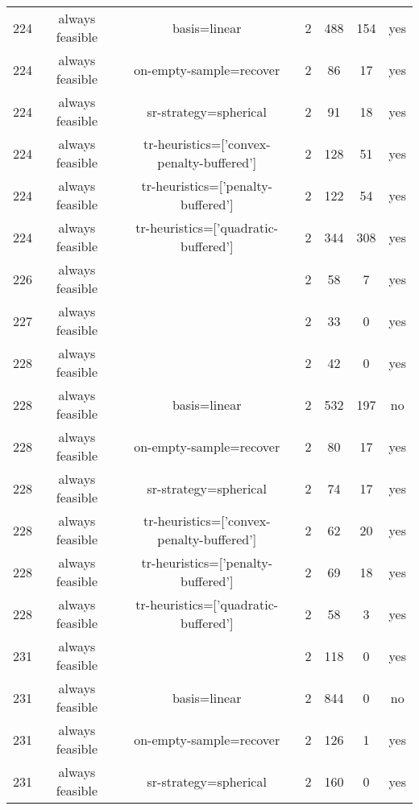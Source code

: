 \begin{scriptsize}
\begin{center}
\begin{longtable}{ccccccc}
224 & always feasible &                              basis=linear & 2 &    488 &    154 &     yes\\
224 & always feasible &                   on-empty-sample=recover & 2 &     86 &     17 &     yes\\
224 & always feasible &                     sr-strategy=spherical & 2 &     91 &     18 &     yes\\
224 & always feasible & tr-heuristics=['convex-penalty-buffered'] & 2 &    128 &     51 &     yes\\
224 & always feasible &        tr-heuristics=['penalty-buffered'] & 2 &    122 &     54 &     yes\\
224 & always feasible &      tr-heuristics=['quadratic-buffered'] & 2 &    344 &    308 &     yes\\
226 & always feasible &                                           & 2 &     58 &      7 &     yes\\
227 & always feasible &                                           & 2 &     33 &      0 &     yes\\
228 & always feasible &                                           & 2 &     42 &      0 &     yes\\
228 & always feasible &                              basis=linear & 2 &    532 &    197 &      no\\
228 & always feasible &                   on-empty-sample=recover & 2 &     80 &     17 &     yes\\
228 & always feasible &                     sr-strategy=spherical & 2 &     74 &     17 &     yes\\
228 & always feasible & tr-heuristics=['convex-penalty-buffered'] & 2 &     62 &     20 &     yes\\
228 & always feasible &        tr-heuristics=['penalty-buffered'] & 2 &     69 &     18 &     yes\\
228 & always feasible &      tr-heuristics=['quadratic-buffered'] & 2 &     58 &      3 &     yes\\
231 & always feasible &                                           & 2 &    118 &      0 &     yes\\
231 & always feasible &                              basis=linear & 2 &    844 &      0 &      no\\
231 & always feasible &                   on-empty-sample=recover & 2 &    126 &      1 &     yes\\
231 & always feasible &                     sr-strategy=spherical & 2 &    160 &      0 &     yes\\

\end{longtable}
\end{center}
\end{scriptsize}
